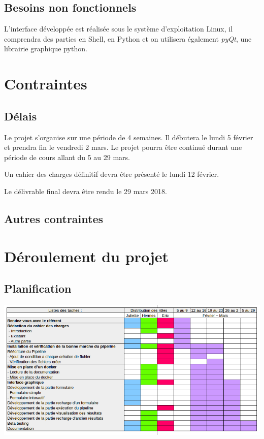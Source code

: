 \documentclass[12pt]{article}
\begin{document}
\subsection{Besoins non fonctionnels}

L'interface développée est réalisée sous le système d'exploitation Linux, il comprendra des parties en Shell, en Python et on utilisera également \textit{pyQt}, une librairie graphique python.

\section{Contraintes}
\subsection{Délais}

Le projet s'organise sur une période de 4 semaines. Il débutera le lundi 5 février et prendra fin le vendredi 2 mars. Le projet pourra être continué durant une période de cours allant du 5 au 29 mars.

Un cahier des charges définitif devra être présenté le lundi 12 février.

Le délivrable final devra être rendu le 29 mars 2018.

\subsection{Autres contraintes}
\section{Déroulement du projet}
\subsection{Planification}

\includegraphics[scale=0.6]{gantt.png}
\end{document}
